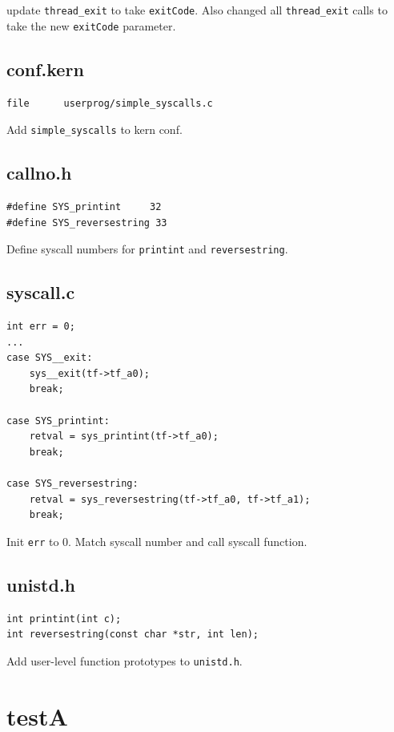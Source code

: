 \documentclass[10pt]{article}
\begin{document}
update \verb|thread_exit| to take \verb|exitCode|. Also changed all \verb|thread_exit| calls to take
the new \verb|exitCode| parameter.


\subsection*{conf.kern}
\begin{verbatim}
file      userprog/simple_syscalls.c
\end{verbatim}

Add \verb|simple_syscalls| to kern conf.


\subsection*{callno.h}
\begin{verbatim}
#define SYS_printint     32
#define SYS_reversestring 33
\end{verbatim}

Define syscall numbers for \verb|printint| and \verb|reversestring|.


\subsection*{syscall.c}
\begin{verbatim}
int err = 0;
...
case SYS__exit:
    sys__exit(tf->tf_a0);
    break;

case SYS_printint:
    retval = sys_printint(tf->tf_a0);
    break;

case SYS_reversestring:
    retval = sys_reversestring(tf->tf_a0, tf->tf_a1);
    break;
\end{verbatim}

Init \verb|err| to 0. Match syscall number and call syscall function.


\subsection*{unistd.h}
\begin{verbatim}
int printint(int c);
int reversestring(const char *str, int len);
\end{verbatim}

Add user-level function prototypes to \verb|unistd.h|.


\section*{testA}
\end{document}
